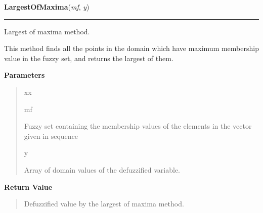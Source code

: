     \begin{boxedminipage}{\textwidth}

    \raggedright \textbf{LargestOfMaxima}(\textit{mf}, \textit{y})

    \vspace{-1.5ex}

    \rule{\textwidth}{0.5\fboxrule}

Largest of maxima method.

This method finds all the points in the domain which have maximum membership
value in the fuzzy set, and returns the largest of them.
    \vspace{1ex}

      \textbf{Parameters}
      \begin{quote}
        \begin{Ventry}{xx}

          \item[mf]


Fuzzy set containing the membership values of the elements in the
vector given in sequence
          \item[y]


Array of domain values of the defuzzified variable.
        \end{Ventry}

      \end{quote}

    \vspace{1ex}

      \textbf{Return Value}
      \begin{quote}

Defuzzified value by the largest of maxima method.
      \end{quote}

    \vspace{1ex}

    \end{boxedminipage}

    \label{peach:fuzzy:defuzzy:MeanOfMaxima}

    \vspace{0.5ex}

